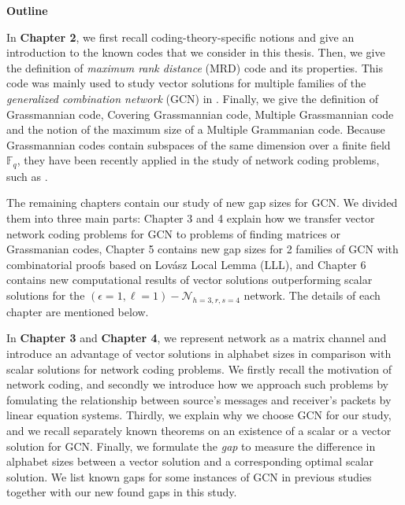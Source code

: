 \textbf{Outline}

In \textbf{Chapter 2}, we first recall coding-theory-specific notions
and give an introduction to the known codes that we consider in this
thesis. Then, we give the definition of \textit{maximum rank distance}
(MRD) code and its properties. This code was mainly used to study
vector solutions for multiple families of the \textit{generalized
combination network} (GCN) in \cite{Wachter-Zeh:2018}. Finally, we
give the definition of Grassmannian code, Covering Grassmannian code,
Multiple Grassmannian code and the notion of the maximum size of a
Multiple Grammanian code. Because Grassmannian codes contain subspaces
of the same dimension over a finite field $\ensuremath{\mathbb{F}}_{q}$,
they have been recently applied in the study of network coding problems,
such as \cite{Etzion:2016,Etzion:2018,Wachter-Zeh:2018,Zhang:2019}.

The remaining chapters contain our study of new gap sizes for GCN.
We divided them into three main parts: Chapter 3 and 4 explain how
we transfer vector network coding problems for GCN to problems of
finding matrices or Grassmanian codes, Chapter 5 contains new gap
sizes for 2 families of GCN with combinatorial proofs based on Lov\'asz
Local Lemma (LLL), and Chapter 6 contains new computational results
of vector solutions outperforming scalar solutions for the $\left(\epsilon=1,\ell=1\right)-\mathcal{N}_{h=3,r,s=4}$
network. The details of each chapter are mentioned below.

In \textbf{Chapter 3} and \textbf{Chapter 4}, we represent network
as a matrix channel and introduce an advantage of vector solutions
in alphabet sizes in comparison with scalar solutions for network
coding problems. We firstly recall the motivation of network coding,
and secondly we introduce how we approach such problems by fomulating
the relationship between source's messages and receiver's packets
by linear equation systems. Thirdly, we explain why we choose GCN
for our study, and we recall separately known theorems on an existence
of a scalar or a vector solution for GCN. Finally, we formulate the
\textit{gap} to measure the difference in alphabet sizes between a
vector solution and a corresponding optimal scalar solution. We list
known gaps for some instances of GCN in previous studies together
with our new found gaps in this study.

